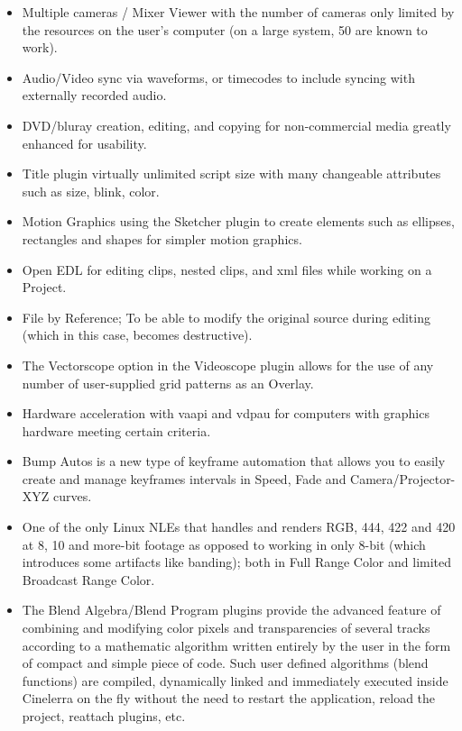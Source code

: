 \begin{description}
\begin{itemize}
                    \item Multiple cameras / Mixer Viewer with the number of cameras only limited by the resources on the user’s computer (on a large system, 50 are known to work).
                    \item Audio/Video sync via waveforms, or timecodes to include syncing with externally recorded audio.
                    \item DVD/bluray creation, editing, and copying for non-commercial media greatly enhanced for usability.
                    \item Title plugin virtually unlimited script size with many changeable attributes such as size, blink, color.
                    \item Motion Graphics using the Sketcher plugin to create elements such as ellipses, rectangles and shapes for simpler motion graphics.
                    \item Open EDL for editing clips, nested clips, and xml files while working on a Project.
    		   	 \item File by Reference; To be able to modify the original source during editing (which in this case, becomes destructive).
                    \item The Vectorscope option in the Videoscope plugin allows for the use of any number of user-supplied grid patterns as an Overlay.
                    \item Hardware acceleration with vaapi and vdpau for computers with graphics hardware meeting certain criteria.
                    \item Bump Autos is a new type of keyframe automation that allows you to easily create and manage keyframes intervals in Speed, Fade and Camera/Projector-XYZ curves.
	   	   			 \item One of the only Linux NLEs that handles and renders RGB, 444, 422 and 420 at 8, 10 and more-bit footage as opposed to working in only 8-bit (which introduces some artifacts like banding); both in Full Range Color and limited Broadcast Range Color.
                     \item The Blend Algebra/Blend Program plugins provide the advanced feature of combining and modifying color pixels and transparencies of several tracks according to a mathematic algorithm written entirely by the user in the form of compact and simple piece of code. Such user defined algorithms (blend functions) are compiled, dynamically linked and immediately executed inside Cinelerra on the fly without the need to restart the application, reload the project, reattach plugins, etc. 
                \end{itemize}
\end{description}

